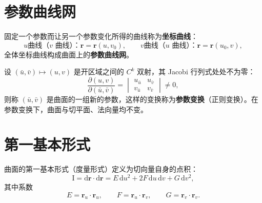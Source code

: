 \section{参数曲线网}

\begin{definition}[坐标曲线]
	固定一个参数而让另一个参数变化所得的曲线称为\textbf{坐标曲线}：
	\begin{equation}
		u\text{曲线（$v$ 曲线）：}\boldsymbol{r}=\boldsymbol{r}(u,v_0),\qquad
		v\text{曲线（$u$ 曲线）：}\boldsymbol{r}=\boldsymbol{r}(u_0,v),
		\label{eq:坐标曲线:定义}
	\end{equation}
	全体坐标曲线构成曲面上的\textbf{参数曲线网}。
\end{definition}

\begin{definition}[参数变换]
	设 $(\bar u,\bar v)\mapsto(u,v)$ 是开区域之间的 $C^k$ 双射，其 Jacobi 行列式处处不为零：
	\begin{equation}
		\frac{\partial(u,v)}{\partial(\bar u,\bar v)}
		=
		\begin{vmatrix}
			u_{\bar u} & u_{\bar v}\\
			v_{\bar u} & v_{\bar v}
		\end{vmatrix}
		\neq0,
		\label{eq:参数变换:Jacobi}
	\end{equation}
	则称 $(\bar u,\bar v)$ 是曲面的一组新的参数，这样的变换称为\textbf{参数变换}（正则变换）。在参数变换下，曲面与切平面、法向量均不变。
\end{definition}

\section{第一基本形式}

\begin{definition}[第一基本形式]
	曲面的第一基本形式（度量形式）定义为切向量自身的点积：
	\begin{equation}
		\mathrm{I}=\mathrm{d}\boldsymbol{r}\cdot\mathrm{d}\boldsymbol{r}
		=E\,\mathrm{d}u^{2}+2F\,\mathrm{d}u\,\mathrm{d}v+G\,\mathrm{d}v^{2},
		\label{eq:第一基本形式:定义}
	\end{equation}
	其中系数
	\begin{equation}
		E=\boldsymbol{r}_u\cdot\boldsymbol{r}_u,\qquad
		F=\boldsymbol{r}_u\cdot\boldsymbol{r}_v,\qquad
		G=\boldsymbol{r}_v\cdot\boldsymbol{r}_v.
		\label{eq:第一基本形式:系数}
	\end{equation}
\end{definition}

